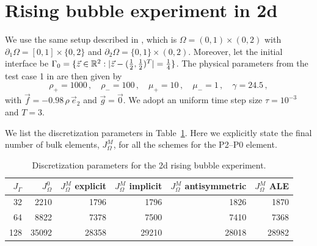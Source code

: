 \section{Rising bubble experiment in 2d}\label{sec:2d_rising_bubble_results}
We use the same  setup described in \cite[Figure~2]{HysingTKPBGT09}, which is
${\Omega = (0,1) \times (0,2)}$ with $\partial_1\Omega = [0,1] \times \{0,2\}$
and $\partial_2\Omega = \{0,1\} \times (0,2)$. Moreover, let the initial
interface be ${\Gamma_0 = \{\vec z \in \mathbb R^2 : |\vec z - (\frac{1}{2},
\frac{1}{2})^T| = \frac{1}{4}\}}$. The physical parameters from the test case 1
in \cite[Table~I]{HysingTKPBGT09} are then given by
\begin{equation} \label{eq:Hysing1}
\rho_+ = 1000\,,\quad \rho_- = 100\,,\quad \mu_+ = 10\,,\quad \mu_- = 1\,,\quad
\gamma = 24.5\,,
\end{equation}
with $\vec f = -0.98\,\rho\,\vec e_2$ and $\vec g=\vec 0$. We adopt an uniform
time step size $\tau=10^{-3}$ and $T=3$.

We list the discretization parameters in Table~\ref{tab:risingbubble2Delements}.
Here we explicitly state the final number of bulk elements, $J_\Omega^M$, for
all the schemes for the P2--P0 element.
\begin{table}
\center
\begin{tabular}{rrrrrr}
\hline
$J_\Gamma$ & $J_\Omega^0$ & $J_\Omega^M$ explicit & $J_\Omega^M$ implicit &
$J_\Omega^M$ antisymmetric & $J_\Omega^M$ ALE \\
\hline
 32 &  2210 &  1796 &  1796 &  1826 &  1870 \\
 64 &  8822 &  7378 &  7500 &  7410 &  7368 \\
128 & 35092 & 28358 & 29210 & 28018 & 28982 \\
\hline
\end{tabular}
\caption[Navier--Stokes 2d rising bubble meshes parameters]
{Discretization parameters for the 2d rising bubble experiment.}
\label{tab:risingbubble2Delements}
\end{table}

